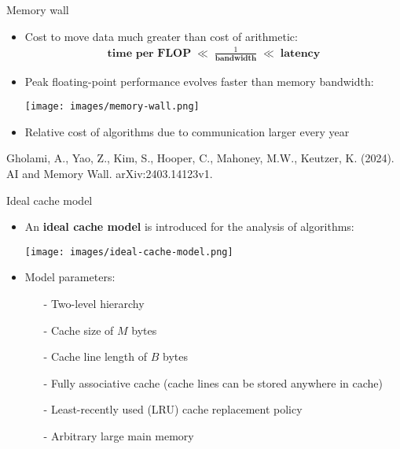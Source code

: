 \documentclass[t,usepdftitle=false]{beamer}
\begin{document}
\begin{frame}{Memory wall}
\begin{itemize}
\item Cost to move data much greater than cost of arithmetic:
\begin{align*}
\textbf{time per FLOP}\;\ll\;\frac{1}{\textbf{bandwidth}}\;\ll\;\textbf{latency}
\end{align*}
\item Peak floating-point performance evolves faster than memory bandwidth:\vspace{.1cm}
\begin{center}\texttt{[image: images/memory-wall.png]}\end{center}
\item Relative cost of algorithms due to communication larger every year
\end{itemize}
\smallskip
\tiny{Gholami, A., Yao, Z., Kim, S., Hooper, C., Mahoney, M.W., Keutzer, K. (2024). AI and Memory Wall. arXiv:2403.14123v1.}
\end{frame}

\begin{frame}{Ideal cache model}
\begin{itemize}
\item An \textbf{ideal cache model} is introduced for the analysis of algorithms:
\begin{center}\texttt{[image: images/ideal-cache-model.png]}\end{center}
\item Model parameters:
\begin{itemize}\normalsize
\item[-] Two-level hierarchy
\item[-] Cache size of $M$ bytes
\item[-] Cache line length of $B$ bytes
\item[-] Fully associative cache (cache lines can be stored anywhere in cache)
\item[-] Least-recently used (LRU) cache replacement policy
\item[-] Arbitrary large main memory
\end{itemize}
\end{itemize}
\end{frame}
\end{document}
